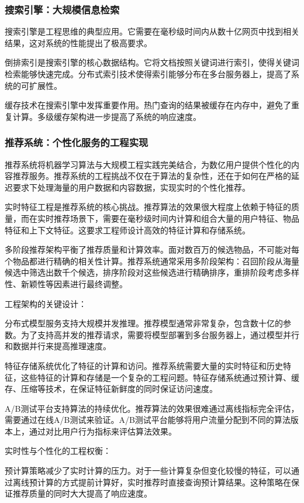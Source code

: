 
\subsubsection{搜索引擎：大规模信息检索}

搜索引擎是工程思维的典型应用。它需要在毫秒级时间内从数十亿网页中找到相关结果，这对系统的性能提出了极高要求。

倒排索引是搜索引擎的核心数据结构。它将文档按照关键词进行索引，使得关键词检索能够快速完成。分布式索引技术使得索引能够分布在多台服务器上，提高了系统的可扩展性。

缓存技术在搜索引擎中发挥重要作用。热门查询的结果被缓存在内存中，避免了重复计算。多级缓存架构进一步提高了系统的响应速度。

\subsubsection{推荐系统：个性化服务的工程实现}

推荐系统将机器学习算法与大规模工程实践完美结合，为数亿用户提供个性化的内容推荐服务。推荐系统的工程挑战不仅在于算法的复杂性，还在于如何在严格的延迟要求下处理海量的用户数据和内容数据，实现实时的个性化推荐。

实时特征工程是推荐系统的核心挑战。推荐算法的效果很大程度上依赖于特征的质量，而在实时推荐场景下，需要在毫秒级时间内计算和组合大量的用户特征、物品特征和上下文特征。这要求工程师设计高效的特征计算和存储系统。

多阶段推荐架构平衡了推荐质量和计算效率。面对数百万的候选物品，不可能对每个物品都进行精确的相关性计算。推荐系统通常采用多阶段架构：召回阶段从海量候选中筛选出数千个候选，排序阶段对这些候选进行精确排序，重排阶段考虑多样性、新颖性等因素进行最终调整。

工程架构的关键设计：

分布式模型服务支持大规模并发推理。推荐模型通常非常复杂，包含数十亿的参数。为了支持高并发的推荐请求，需要将模型部署到多台服务器上，通过模型并行和数据并行来提高推理速度。

特征存储系统优化了特征的计算和访问。推荐系统需要大量的实时特征和历史特征，这些特征的计算和存储是一个复杂的工程问题。特征存储系统通过预计算、缓存、压缩等技术，在保证特征新鲜度的同时保证访问速度。

A/B测试平台支持算法的持续优化。推荐算法的效果很难通过离线指标完全评估，需要通过在线A/B测试来验证。A/B测试平台能够将用户流量分配到不同的算法版本上，通过对比用户行为指标来评估算法效果。

实时性与个性化的工程权衡：

预计算策略减少了实时计算的压力。对于一些计算复杂但变化较慢的特征，可以通过离线预计算的方式提前计算好，实时推荐时直接查询预计算结果。这种策略在保证推荐质量的同时大大提高了响应速度。

